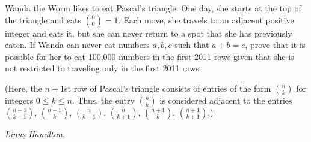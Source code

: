 Wanda the Worm likes to eat Pascal's triangle. One day, she starts at the top of the triangle and eats $\textstyle\binom{0}{0}=1$. Each move, she travels to an adjacent positive integer and eats it, but she can never return to a spot that she has previously eaten. If Wanda can never eat numbers $a,b,c$ such that $a+b=c$, prove that it is possible for her to eat 100,000 numbers in the first 2011 rows given that she is not restricted to traveling only in the first 2011 rows.

(Here, the $n+1$st row of Pascal's triangle consists of entries of the form $\textstyle\binom{n}{k}$ for integers $0\le k\le n$. Thus, the entry $\textstyle\binom{n}{k}$ is considered adjacent to the entries $\textstyle\binom{n-1}{k-1}$, $\textstyle\binom{n-1}{k}$, $\textstyle\binom{n}{k-1}$, $\textstyle\binom{n}{k+1}$, $\textstyle\binom{n+1}{k}$, $\textstyle\binom{n+1}{k+1}$.)

\textit{Linus Hamilton.}